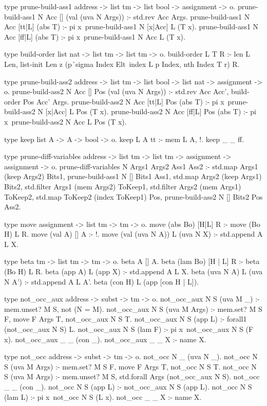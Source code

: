 \begin{elpicode}
  type prune-build-ass1 address -> list tm -> 
                        list bool -> assignment -> o.
  prune-build-ass1 N Acc [] (val (uva N Args)) :- 
    std.rev Acc Args.
  prune-build-ass1 N Acc [tt|L] (abs T) :- 
    pi x\ prune-build-ass1 N [x|Acc] L (T x).
  prune-build-ass1 N Acc [ff|L] (abs T) :- 
    pi x\ prune-build-ass1 N Acc L (T x).

  type build-order list nat -> list tm -> list tm -> o.
  build-order L T R :-
    len L Len, list-init Len z 
      (p\r\ sigma Index Elt\ index L p Index, nth Index T r) R.

  type prune-build-ass2 address -> list tm -> list bool -> 
                      list nat -> assignment -> o.
  prune-build-ass2 N Acc [] Pos (val (uva N Args)) :- 
    std.rev Acc Acc', build-order Pos Acc' Args.
  prune-build-ass2 N Acc [tt|L] Pos (abs T) :- 
    pi x\ prune-build-ass2 N [x|Acc] L Pos (T x).
  prune-build-ass2 N Acc [ff|L] Pos (abs T) :- 
    pi x\ prune-build-ass2 N Acc L Pos (T x).

  type keep list A -> A -> bool -> o.
  keep L A tt :- mem L A, !.
  keep _ _ ff.

  type prune-diff-variables address -> list tm -> list tm -> 
                            assignment -> assignment -> o.
  prune-diff-variables N Args1 Args2 Ass1 Ass2 :-
    std.map Args1 (keep Args2) Bits1, 
    prune-build-ass1 N [] Bits1 Ass1,
    std.map Args2 (keep Args1) Bits2, 
    std.filter Args1 (mem Args2) ToKeep1,
    std.filter Args2 (mem Args1) ToKeep2,
    std.map ToKeep2 (index ToKeep1) Pos,
    prune-build-ass2 N [] Bits2 Pos Ass2.

  type move assignment -> list tm -> tm -> o.
  move (abs Bo)        [H|L] R :- move (Bo H) L R.
  move (val A)         []    A :- !.
  move (val (uva N A)) L     (uva N X) :- std.append A L X.

  type beta tm -> list tm -> tm -> o.
  beta A [] A.
  beta (lam Bo) [H | L] R :- beta (Bo H) L R.
  beta (app A) L (app X) :- std.append A L X.
  beta (uva N A) L (uva N A') :- std.append A L A'.
  beta (con H) L (app [con H | L]).

  type not_occ_aux address -> subst -> tm -> o.
  not_occ_aux N S (uva M _) :- mem.unset? M S, not (N = M).
  not_occ_aux N S (uva M Args) :- mem.set? M S F, 
    move F Args T, not_occ_aux N S T.
  not_occ_aux N S (app L) :- forall1 (not_occ_aux N S) L.
  not_occ_aux N S (lam F) :- pi x\ not_occ_aux N S (F x).
  not_occ_aux _ _ (con _).
  not_occ_aux _ _ X :- name X.
  
  type not_occ  address -> subst -> tm -> o.
  not_occ N _ (uva N _).
  not_occ N S (uva M Args) :- mem.set? M S F, 
    move F Args T, not_occ N S T.
  not_occ N S (uva M Args) :- mem.unset? M S, 
    std.forall Args (not_occ_aux N S).
  not_occ _ _ (con _).
  not_occ N S (app L) :- not_occ_aux N S (app L).
  not_occ N S (lam L) :- pi x\ not_occ N S (L x).
  not_occ _ _ X :- name X.


\end{elpicode}

